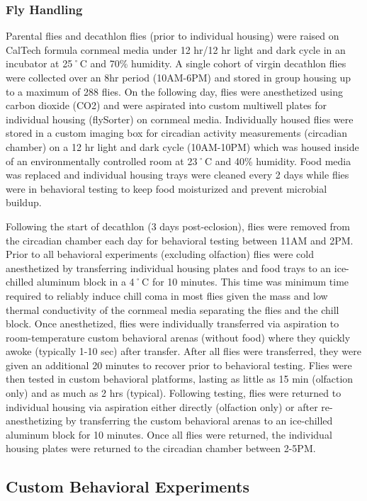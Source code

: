 \documentclass[12pt,letterpaper]{article}
\begin{document}
\subsubsection{Fly Handling}

Parental flies and decathlon flies (prior to individual housing) were raised on CalTech formula cornmeal media under 12 hr/12 hr light and dark cycle in an incubator at 25˚C and 70\% humidity. A single cohort of virgin decathlon flies were collected over an 8hr period (10AM-6PM) and stored in group housing up to a maximum of 288 flies. On the following day, flies were anesthetized using carbon dioxide (CO2) and were aspirated into custom multiwell plates for individual housing (flySorter) on cornmeal media. Individually housed flies were stored in a custom imaging box for circadian activity measurements (circadian chamber) on a 12 hr light and dark cycle (10AM-10PM) which was housed inside of an environmentally controlled room at 23˚C and 40\% humidity. Food media was replaced and individual housing trays were cleaned every 2 days while flies were in behavioral testing to keep food moisturized and prevent microbial buildup.

Following the start of decathlon (3 days post-eclosion), flies were removed from the circadian chamber each day for behavioral testing between 11AM and 2PM. Prior to all behavioral experiments (excluding olfaction) flies were cold anesthetized by transferring individual housing plates and food trays to an ice-chilled aluminum block in a 4˚C for 10 minutes. This time was minimum time required to reliably induce chill coma in most flies given the mass and low thermal conductivity of the cornmeal media separating the flies and the chill block. Once anesthetized, flies were individually transferred via aspiration to room-temperature custom behavioral arenas (without food) where they quickly awoke (typically 1-10 sec) after transfer. After all flies were transferred, they were given an additional 20 minutes to recover prior to behavioral testing. Flies were then tested in custom behavioral platforms, lasting as little as 15 min (olfaction only) and as much as 2 hrs (typical). Following testing, flies were returned to individual housing via aspiration either directly (olfaction only) or after re-anesthetizing by transferring the custom behavioral arenas to an ice-chilled aluminum block for 10 minutes. Once all flies were returned, the individual housing plates were returned to the circadian chamber between 2-5PM.

\subsection{Custom Behavioral Experiments}
\end{document}
